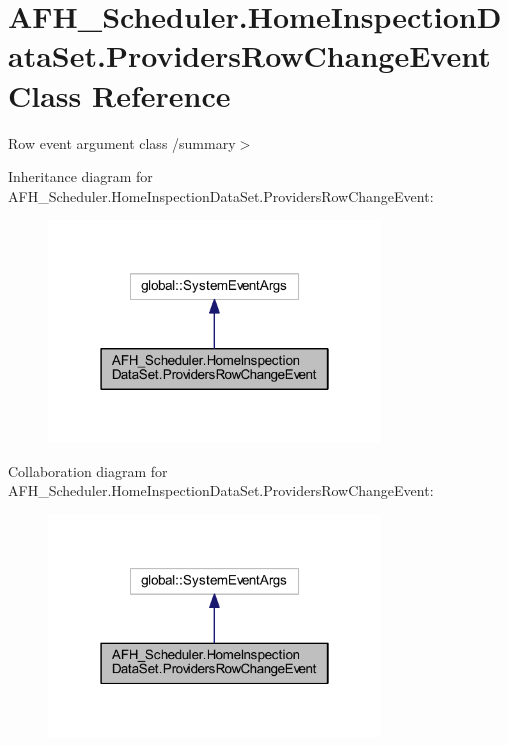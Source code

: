 \section{A\+F\+H\+\_\+\+Scheduler.\+Home\+Inspection\+Data\+Set.\+Providers\+Row\+Change\+Event Class Reference}
\label{class_a_f_h___scheduler_1_1_home_inspection_data_set_1_1_providers_row_change_event}


Row event argument class /summary$>$  




Inheritance diagram for A\+F\+H\+\_\+\+Scheduler.\+Home\+Inspection\+Data\+Set.\+Providers\+Row\+Change\+Event\+:
\nopagebreak
\begin{figure}[H]
\begin{center}
\leavevmode
\includegraphics[width=250pt]{class_a_f_h___scheduler_1_1_home_inspection_data_set_1_1_providers_row_change_event__inherit__graph}
\end{center}
\end{figure}


Collaboration diagram for A\+F\+H\+\_\+\+Scheduler.\+Home\+Inspection\+Data\+Set.\+Providers\+Row\+Change\+Event\+:
\nopagebreak
\begin{figure}[H]
\begin{center}
\leavevmode
\includegraphics[width=250pt]{class_a_f_h___scheduler_1_1_home_inspection_data_set_1_1_providers_row_change_event__coll__graph}
\end{center}
\end{figure}
